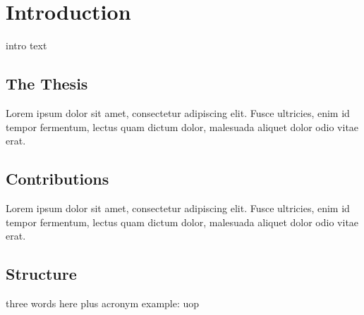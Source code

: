 \chapter{Introduction}
intro text \cite{kennedy2016social}

\section{The Thesis}\label{sec:intro-thesis}
Lorem ipsum dolor sit amet, consectetur adipiscing elit. Fusce ultricies, enim id tempor fermentum, lectus quam dictum dolor, malesuada aliquet dolor odio vitae erat. 

\section{Contributions}\label{sec:intro-contr}
Lorem ipsum dolor sit amet, consectetur adipiscing elit. Fusce ultricies, enim id tempor fermentum, lectus quam dictum dolor, malesuada aliquet dolor odio vitae erat. 

\section{Structure}\label{sec:intro-struct}
three words here plus acronym example: \acrshort{uop}